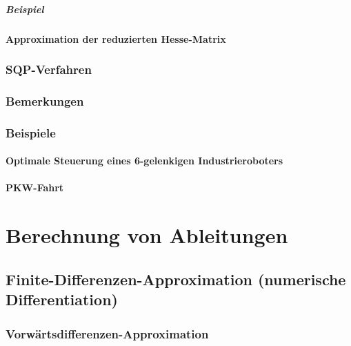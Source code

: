 				\paragraph{Beispiel} %

			\subsubsection{Approximation der reduzierten Hesse-Matrix} %

		\subsection{SQP-Verfahren} %

		\subsection{Bemerkungen} %

		\subsection{Beispiele} %

			\subsubsection{Optimale Steuerung eines 6-gelenkigen Industrieroboters} %

			\subsubsection{PKW-Fahrt} %

\chapter{Berechnung von Ableitungen} %

	\section{Finite-Differenzen-Approximation (numerische Differentiation)} %

		\subsection{Vorwärtsdifferenzen-Approximation} %

